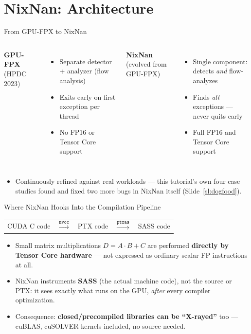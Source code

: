 \documentclass[aspectratio=169,11pt]{beamer}
\begin{document}
\section{NixNan: Architecture}

\begin{frame}{From GPU-FPX to NixNan}
\begin{columns}
\textbf{GPU-FPX} (HPDC 2023)
\begin{itemize}
  \item Separate detector + analyzer (flow analysis)
  \item Exits early on first exception per thread
  \item No FP16 or Tensor Core support
\end{itemize}
\textbf{NixNan} (evolved from GPU-FPX)
\begin{itemize}
  \item Single component: detects \emph{and} flow-analyzes
  \item Finds \emph{all} exceptions --- never quits early
  \item Full FP16 and Tensor Core support
\end{itemize}
\end{columns}
\vspace{0.5em}
\begin{itemize}
  \item Continuously refined against real workloads --- this tutorial's own
    four case studies found and fixed two more bugs in NixNan itself
    (Slide~\ref{sl:dogfood}).
\end{itemize}
\end{frame}

\begin{frame}{Where NixNan Hooks Into the Compilation Pipeline}
\begin{center}
\begin{tabular}{ccccc}
CUDA C code & $\xrightarrow{\texttt{nvcc}}$ & PTX code & $\xrightarrow{\texttt{ptxas}}$ & SASS code \\
\end{tabular}
\end{center}
\begin{itemize}
  \item Small matrix multiplications $D = A{\cdot}B + C$ are performed
    \textbf{directly by Tensor Core hardware} --- not expressed as ordinary
    scalar FP instructions at all.
  \item NixNan instruments \textbf{SASS} (the actual machine code), not the
    source or PTX: it sees exactly what runs on the GPU, \emph{after} every
    compiler optimization.
  \item Consequence: \textbf{closed/precompiled libraries can be
    ``X-rayed''} too --- cuBLAS, cuSOLVER kernels included, no source needed.
\end{itemize}
\end{frame}
\end{document}
